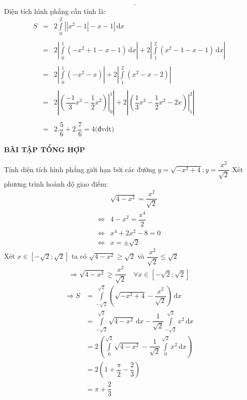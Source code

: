 \begin{bt}
{$$\begin{array}{l}
\begin{array}{*{20}{l}}
		\end{array}
		\end{array}.$$
		Diện tích hình phẳng cần tính là:
		$$
		\begin{array}{*{20}{l}}
		S& = & 2\displaystyle\int\limits_0^2 {\left| {\left| {{x^2} - 1} \right| - x - 1} \right|} \mathrm{\,d}x\\\\
		&= &2\left| {\displaystyle\int\limits_0^1 {\left( { - {x^2} + 1 - x - 1} \right)}\mathrm{\,d}x } \right| + 2\left| {\displaystyle\int\limits_1^2 {\left( {{x^2} - 1 - x - 1} \right)} \mathrm{\,d}x } \right|\\\\
		{}&=&{ 2\left| {\displaystyle\int\limits_0^1 {\left( { - {x^2} - x} \right)} } \right| + 2\left| {\displaystyle\int\limits_1^2 {\left( {{x^2} - x - 2} \right)} } \right|}\\\\
		{}&=&{ 2\left| {\left. {\left( {\dfrac{{ - 1}}{3}{x^3} - \dfrac{1}{2}{x^2}} \right)} \right|_0^1} \right|}
		+ 2\left| {\left. {\left( {\dfrac{1}{3}{x^3} - \dfrac{1}{2}{x^2} - 2x} \right)} \right|_1^2} \right|\\\\
		{}&=&{2.\dfrac{5}{6} + 2.\dfrac{7}{6} = 4 \text{(đvdt)}}
		\end{array}$$
	}
\end{bt}
\begin{center}
	\textbf{BÀI TẬP TỔNG HỢP}
\end{center}
\begin{ex}%
	Tính diện tích hình phẳng giới hạn bởi các đường $ y=\sqrt{-x^2+4}; y=\dfrac{x^2}{\sqrt{2}} $
	\loigiai
	{Xét phương trình hoành độ giao điểm:
		\begin{align*}
		&\sqrt{4-x^2}=\dfrac{x^2}{\sqrt{2}}\\
		\Leftrightarrow &4-x^2=\dfrac{x^4}{2}\\
		\Leftrightarrow &x^4+2x^2-8=0\\
		\Leftrightarrow &x=\pm \sqrt{2}
		\end{align*}
		Xét $ x \in [-\sqrt{2};\sqrt{2}] $ ta có $ \sqrt{4-x^2}\geq \sqrt{2} $ và $ \dfrac{x^2}{\sqrt{2}}\leq \sqrt{2} $\\
		\[ \Rightarrow \sqrt{4-x^2}\geq\dfrac{x^2}{\sqrt{2}}\quad \forall x \in [-\sqrt{2};\sqrt{2}] \]
		\begin{align*}
		\Rightarrow S&=\int\limits_{-\sqrt{2}}^{\sqrt{2}}\left(\sqrt{-x^2+4}-\dfrac{x^2}{\sqrt{2}}\right)\mathrm{\,d}x\\
		&=\int\limits_{-\sqrt{2}}^{\sqrt{2}}\sqrt{4-x^2}\mathrm{\,d}x-\dfrac{1}{\sqrt{2}}\int\limits_{-\sqrt{2}}^{\sqrt{2}}x^2\mathrm{\,d}x\\
		&=2\left(\int\limits_{0}^{\sqrt{2}}\sqrt{4-x^2}-\dfrac{1}{\sqrt{2}}\int\limits_{0}^{\sqrt{2}}x^2\mathrm{\,d}x\right)\\
		&=2\left(1+\dfrac{\pi}{2}-\dfrac{2}{3}\right)\\
		&=\pi +\dfrac{2}{3}
		\end{align*}
	}
\end{ex}

